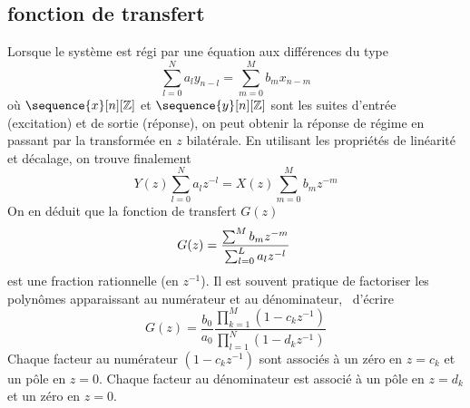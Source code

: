 \subsection{fonction de transfert}
Lorsque le syst\`{e}me est r\'{e}gi par une \'{e}quation aux diff\'{e}rences du type
\begin{equation}
\label{eq:equation-aux-differences}
\sum_{l=0}^{N}a_{l}y_{n-l}=\sum_{m=0}^{M}b_{m}x_{n-m}
\end{equation}
o\`{u} $\sequence{x}[n][\zset]$ et $\sequence{y}[n][\zset]$ sont les suites d'entr\'{e}e (excitation) et de sortie (r\'{e}ponse), on peut obtenir la r\'{e}ponse de r\'{e}gime en passant par la transform\'{e}e en $z$ bilat\'{e}rale. En utilisant les propri\'{e}t\'{e}s de lin\'{e}arit\'{e} et d\'{e}calage, on trouve finalement
\begin{equation}
\label{eq:tz-equation-difference}
Y(z)\sum_{l=0}^{N}a_{l}z^{-l}=X(z)\sum_{m=0}^{M}b_{m}z^{-m}
\end{equation}
On en d\'{e}duit que la fonction de transfert $G(z)$
$$
G(z)=\frac{\sum^{M}b_{m}z^{-m}}{\sum_{l=0}^L a_{l}z^{-l}} \;
$$
est une fraction rationnelle (en $z^{-1}$). Il est souvent pratique de factoriser les polynômes apparaissant
au numérateur et au dénominateur, \ie\ d'écrire
$$
G(z)= \frac{b_0}{a_0} \frac{\prod_{k=1}^M (1-c_k z^{-1})}{\prod_{l=1}^N (1-d_k z^{-1})}
$$
Chaque facteur au numérateur $(1-c_k z^{-1})$ sont associés à un zéro en $z= c_k$ et un pôle en $z=0$.
Chaque facteur au dénominateur est  associé à un pôle en $z=d_k$
et un zéro en  $z=0$.

